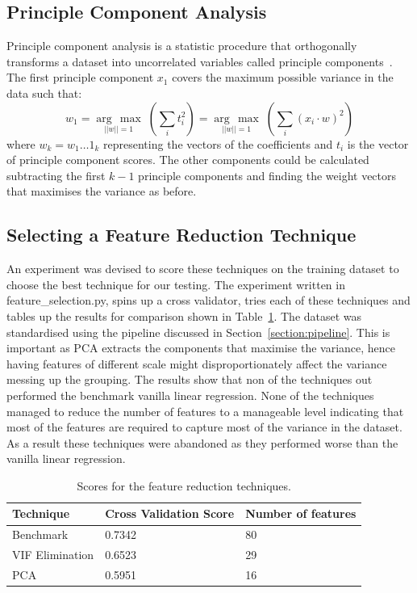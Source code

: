 \documentclass{article}
\newcommand{\argmax}[1]{\underset{#1}{\operatorname{arg}\,\operatorname{max}}\;}
\begin{document}
\subsection{Principle Component Analysis}
Principle component analysis is a statistic procedure that orthogonally transforms a dataset into uncorrelated variables called principle components~\autocite{pearson1901liii}. The first principle component \(x_1\) covers the maximum possible variance in the data such that:
\begin{equation}
    w_1 = \argmax{||w||=1} \left(\sum_i t_i^2 \right) = \argmax{||w||=1}\left(\sum_i (x_i \cdot w)^2 \right)
\end{equation}{}
where \(w_k = w_1\dots 1_k\) representing the vectors of the coefficients and \(t_i\) is the vector of principle component scores. The other components could be calculated subtracting the first \(k-1\) principle components and finding the weight vectors that maximises the variance as before.

\subsection{Selecting a Feature Reduction Technique} An experiment was devised to score these techniques on the training dataset to choose the best technique for our testing. The experiment written in feature\_selection.py, spins up a cross validator, tries each of these techniques and tables up the results for comparison shown in Table~\ref{tab:featurereduction}. The dataset was standardised using the pipeline discussed in Section~\ref{section:pipeline}. This is important as PCA extracts the components that maximise the variance, hence having features of different scale might disproportionately affect the variance messing up the grouping. The results show that non of the techniques out performed the benchmark vanilla linear regression. None of the techniques managed to reduce the number of features to a manageable level indicating that most of the features are required to capture most of the variance in the dataset. As a result these techniques were abandoned as they performed worse than the vanilla linear regression. 
\begin{table}[]
\centering
\begin{tabular}{@{}lll@{}}
\toprule
Technique        & Cross Validation Score & Number of features \\ \midrule
Benchmark       & 0.7342                 & 80                 \\
VIF Elimination & 0.6523                 & 29                 \\
PCA             & 0.5951                 & 16                 \\ \bottomrule
\end{tabular}
\caption{Scores for the feature reduction techniques. }
\label{tab:featurereduction}
\end{table}
\end{document}
